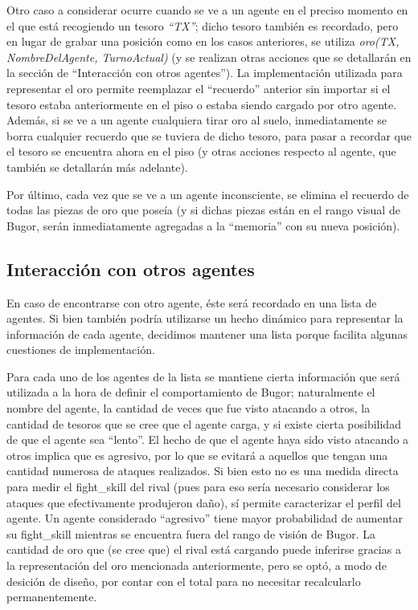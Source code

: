 \documentclass[a4paper,10pt,spanish]{article}
\begin{document}
		Otro caso a considerar ocurre cuando se ve a un agente en el preciso momento en el que est\'a recogiendo un tesoro \emph{``TX''}; dicho tesoro tambi\'en es recordado, pero en lugar de grabar una posici\'on como en los casos anteriores, se utiliza \emph{oro(TX, NombreDelAgente, TurnoActual)} (y se realizan otras acciones que se detallar\'an en la secci\'on de ``Interacci\'on con otros agentes''). La implementaci\'on utilizada para representar el oro permite reemplazar el ``recuerdo'' anterior sin importar si el tesoro estaba anteriormente en el piso o estaba siendo cargado por otro agente. Adem\'as, si se ve a un agente cualquiera tirar oro al suelo, inmediatamente se borra cualquier recuerdo que se tuviera de dicho tesoro, para pasar a recordar que el tesoro se encuentra ahora en el piso (y otras acciones respecto al agente, que tambi\'en se detallar\'an m\'as adelante).
		
		Por \'ultimo, cada vez que se ve a un agente inconsciente, se elimina el recuerdo de todas las piezas de oro que pose\'ia (y si dichas piezas est\'an en el rango visual de Bugor, ser\'an inmediatamente agregadas a la ``memoria'' con su nueva posici\'on).
		
	\subsection{Interacci\'on con otros agentes}
	
	En caso de encontrarse con otro agente, \'este ser\'a recordado en una lista de agentes. Si bien tambi\'en podr\'ia utilizarse un hecho din\'amico para representar la informaci\'on de cada agente, decidimos mantener una lista porque facilita algunas cuestiones de implementaci\'on.
	
	Para cada uno de los agentes de la lista se mantiene cierta informaci\'on que ser\'a utilizada a la hora de definir el comportamiento de Bugor; naturalmente el nombre del agente, la cantidad de veces que fue visto atacando a otros, la cantidad de tesoros que se cree que el agente carga, y si existe cierta posibilidad de que el agente sea ``lento''. El hecho de que el agente haya sido visto atacando a otros implica que es agresivo, por lo que se evitar\'a a aquellos que tengan una cantidad numerosa de ataques realizados. Si bien esto no es una medida directa para medir el fight\_skill del rival (pues para eso ser\'ia necesario considerar los ataques que efectivamente produjeron da\~no), s\'i permite caracterizar el perfil del agente. Un agente considerado ``agresivo'' tiene mayor probabilidad de aumentar su fight\_skill mientras se encuentra fuera del rango de visi\'on de Bugor. La cantidad de oro que (se cree que) el rival est\'a cargando puede inferirse gracias a la representaci\'on del oro mencionada anteriormente, pero se opt\'o, a modo de desici\'on de dise\~no, por contar con el total para no necesitar recalcularlo permanentemente.
	
\end{document}
